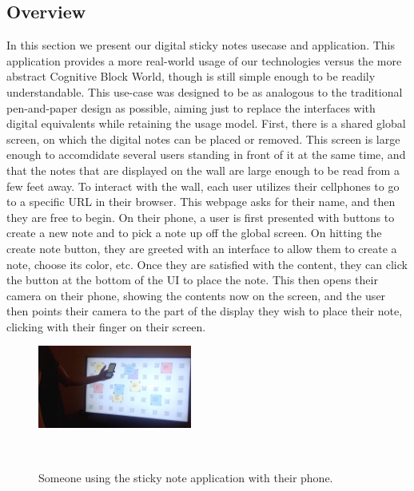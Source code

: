 \subsection{Overview}

In this section we present our digital sticky notes usecase and application. This application provides
a more real-world usage of our technologies versus the more abstract Cognitive Block World, though is
still simple enough to be readily understandable. This use-case was designed to be as analogous to the
traditional pen-and-paper design as possible, aiming just to replace the interfaces with digital equivalents
while retaining the usage model. First, there is a shared global screen, on which the digital notes can be placed
or removed. This screen is large enough to accomdidate several users standing in front of it at the same time,
and that the notes that are displayed on the wall are large enough to be read from a few feet away. To interact
with the wall, each user utilizes their cellphones to go to a specific URL in their browser. This webpage
asks for their name, and then they are free to begin. On their phone, a user is
first presented with buttons to create a new note and to pick a note up off the global screen. On hitting the
create note button, they are greeted with an interface to allow them to create a note, choose its color, etc.
Once they are satisfied with the content, they can click the button at the bottom of the UI to place the note.
This then opens their camera on their phone, showing the contents now on the screen, and the user then points
their camera to the part of the display they wish to place their note, clicking with their finger on their screen.

\begin{figure}
    \centering
    \includegraphics[width=0.45\textwidth]{figures/person_using}
    \caption{Someone using the sticky note application with their phone.}
      ~\label{fig:someone_using}
\end{figure}

